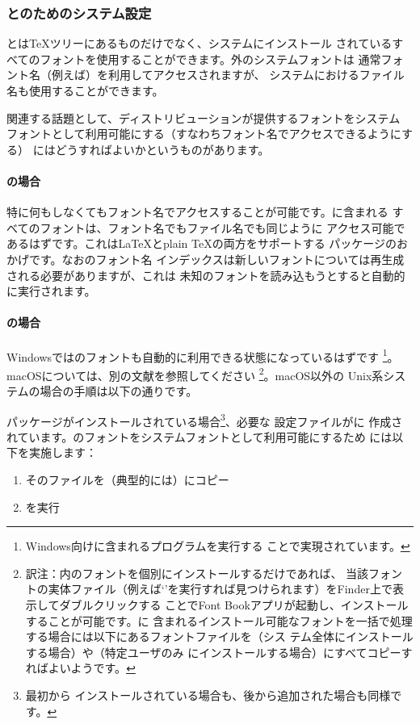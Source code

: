 \documentclass[uplatex,dvipdfmx,12pt,tombow]{jsarticle}
\begin{document}
\subsubsection{\XeTeX と\LuaTeX のためのシステム設定}
\label{sec:font-conf-sys}

\XeTeX と\LuaTeX は\TeX ツリーにあるものだけでなく、システムにインストール
されているすべてのフォントを使用することができます。\TL 外のシステムフォントは
通常フォント名（例えば）を利用してアクセスされますが、
システムにおけるファイル名も使用することができます。

関連する話題として、\TL ディストリビューションが提供するフォントをシステム
フォントとして利用可能にする（すなわちフォント名でアクセスできるようにする）
にはどうすればよいかというものがあります。

\paragraph{\LuaTeX の場合}
特に何もしなくてもフォント名でアクセスすることが可能です。\TL に含まれる
すべてのフォントは、フォント名でもファイル名でも同じように
アクセス可能であるはずです。これは\LaTeX とplain \TeX の両方をサポートする
パッケージのおかげです。なおのフォント名
インデックスは新しいフォントについては再生成される必要がありますが、これは
未知のフォントを読み込もうとすると自動的に実行されます。

\paragraph{\XeTeX の場合}
Windowsでは\TL のフォントも自動的に利用できる状態になっているはずです
\footnote{Windows向け\TL に含まれるプログラムを実行する
ことで実現されています。}。macOSについては、別の文献を参照してください
\footnote{訳注：\TL 内のフォントを個別にインストールするだけであれば、
当該フォントの実体ファイル（例えば`'を実行すれば見つけられます）をFinder上で表示してダブルクリックする
ことでFont Bookアプリが起動し、インストールすることが可能です。\TL に
含まれるインストール可能なフォントを一括で処理する場合には以下にあるフォントファイルを（シス
テム全体にインストールする場合）や（特定ユーザのみ
にインストールする場合）にすべてコピーすればよいようです。}。macOS以外の
Unix系システムの場合の手順は以下の通りです。

パッケージがインストールされている場合\footnote{最初から
インストールされている場合も、後から追加された場合も同様です。}、必要な
設定ファイルがに
作成されています。\TL のフォントをシステムフォントとして利用可能にするため
には以下を実施します：
%
\begin{enumerate}
\item そのファイルを（典型的には）にコピー
\item {}を実行
\end{enumerate}
\end{document}
